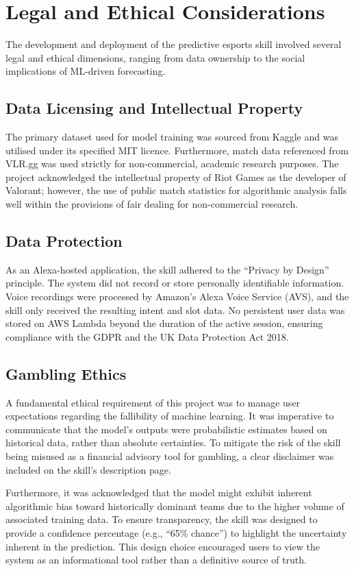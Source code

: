 \section{Legal and Ethical Considerations}
The development and deployment of the predictive esports skill involved several legal and ethical dimensions, ranging from data ownership to the social implications of ML-driven forecasting.

\subsection{Data Licensing and Intellectual Property}
The primary dataset used for model training was sourced from Kaggle \cite{ryanluong_dataset} and was utilised under its specified MIT licence. Furthermore, match data referenced from VLR.gg \cite{vlr_gg} was used strictly for non-commercial, academic research purposes. The project acknowledged the intellectual property of Riot Games as the developer of Valorant; however, the use of public match statistics for algorithmic analysis falls well within the provisions of fair dealing for non-commercial research.

\subsection{Data Protection}
As an Alexa-hosted application, the skill adhered to the ``Privacy by Design'' principle. The system did not record or store personally identifiable information. Voice recordings were processed by Amazon's Alexa Voice Service (AVS), and the skill only received the resulting intent and slot data. No persistent user data was stored on AWS Lambda beyond the duration of the active session, ensuring compliance with the GDPR and the UK Data Protection Act 2018.

\subsection{Gambling Ethics}
A fundamental ethical requirement of this project was to manage user expectations regarding the fallibility of machine learning. It was imperative to communicate that the model's outputs were probabilistic estimates based on historical data, rather than absolute certainties. To mitigate the risk of the skill being misused as a financial advisory tool for gambling, a clear disclaimer was included on the skill's description page. 

Furthermore, it was acknowledged that the model might exhibit inherent algorithmic bias toward historically dominant teams due to the higher volume of associated training data. To ensure transparency, the skill was designed to provide a confidence percentage (e.g., ``65\% chance'') to highlight the uncertainty inherent in the prediction. This design choice encouraged users to view the system as an informational tool rather than a definitive source of truth.

